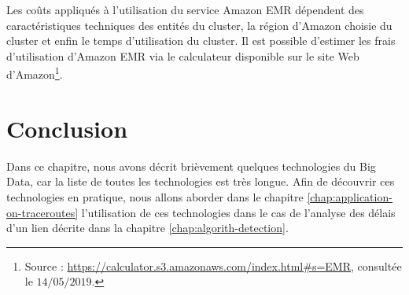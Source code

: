 Les coûts appliqués  à l'utilisation du service Amazon EMR dépendent des caractéristiques techniques des entités du cluster, la région d'Amazon choisie du cluster et enfin le temps d'utilisation du cluster. Il est possible d'estimer les frais d'utilisation d'Amazon EMR via le calculateur disponible sur le site Web d'Amazon\footnote{Source : \url{https://calculator.s3.amazonaws.com/index.html\#s=EMR}, consultée le $14/05/2019$.}.


\section{Conclusion}

Dans ce chapitre,  nous avons décrit brièvement  quelques technologies du Big Data, car la liste de toutes les technologies est très longue. Afin de découvrir ces technologies en pratique, nous allons aborder dans le chapitre \ref{chap:application-on-traceroutes} l'utilisation de ces technologies dans le cas de l'analyse des délais d'un lien décrite dans la chapitre \ref{chap:algorith-detection}.    










